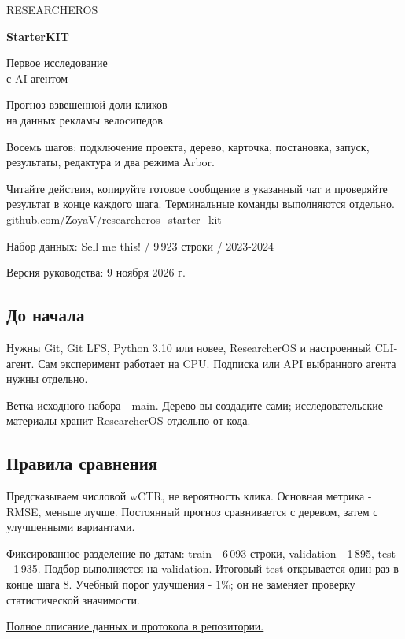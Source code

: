 \documentclass[10pt,a4paper]{article}
\begin{document}
\begin{titlepage}
\vspace*{12mm}
{\color{accent}\large RESEARCHEROS}\par
\vspace{14mm}
{\fontsize{38}{44}\selectfont\bfseries StarterKIT}\par
\vspace{7mm}
{\Large Первое исследование\\с AI-агентом}\par
\vspace{12mm}
{\large Прогноз взвешенной доли кликов\\на данных рекламы велосипедов}\par
\vspace{12mm}
\begin{promptbox}
Восемь шагов: подключение проекта, дерево, карточка, постановка,
запуск, результаты, редактура и два режима Arbor.
\end{promptbox}
\vspace{7mm}
Читайте действия, копируйте готовое сообщение в указанный чат и проверяйте результат в конце каждого шага. Терминальные команды выполняются отдельно.
\vfill
\href{https://github.com/ZoyaV/researcheros_starter_kit}{github.com/ZoyaV/researcheros\_starter\_kit}\par
\small Набор данных: Sell me this! / 9\,923 строки / 2023-2024\par
Версия руководства: 9 ноября 2026 г.
\end{titlepage}
\tableofcontents
\vspace{10mm}
\subsection*{До начала}
Нужны Git, Git LFS, Python 3.10 или новее, ResearcherOS и настроенный CLI-агент. Сам эксперимент работает на CPU. Подписка или API выбранного агента нужны отдельно.

Ветка исходного набора - main. Дерево вы создадите сами; исследовательские материалы хранит ResearcherOS отдельно от кода.
\subsection*{Правила сравнения}
Предсказываем числовой wCTR, не вероятность клика. Основная метрика - RMSE, меньше лучше. Постоянный прогноз сравнивается с деревом, затем с улучшенными вариантами.

Фиксированное разделение по датам: train - 6\,093 строки, validation - 1\,895, test - 1\,935. Подбор выполняется на validation. Итоговый test открывается один раз в конце шага 8. Учебный порог улучшения - 1\%; он не заменяет проверку статистической значимости.

\href{https://github.com/ZoyaV/researcheros_starter_kit/blob/main/data/README.md}{Полное описание данных и протокола в репозитории.}
\end{document}
